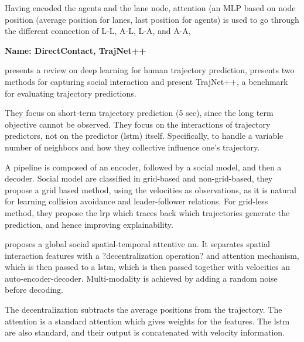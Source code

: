 Having encoded the agents and the lane node, attention (an MLP based on node position (average position for lanes, last position for agents) is used to go through the different connection of L-L, A-L, L-A, and A-A, 


\textbf{Name: DirectContact, TrajNet++}

\cite{kothari2021human} presents a review on deep learning for human trajectory prediction, presents two methods for capturing social interaction and present TrajNet++, a benchmark for evaluating trajectory predictions. 

They focus on short-term trajectory prediction (5 sec), since the long term objective cannot be observed.
%
They focus on the interactions of trajectory predictors, not on the predictor (\gls{lstm}) itself.
%
Specifically, to handle a variable number of neighbors and how they collective influence one's trajectory.

A pipeline is composed of an encoder, followed by a social model, and then a decoder.
%
Social model are classified in grid-based and non-grid-based, they propose a grid based method, using the velocities as observations, as it is natural for learning collision avoidance and leader-follower relations.
%
For grid-less method, they propose the \gls{lrp} which traces back which trajectories generate the prediction, and hence improving explainability.





\cite{xu2021tra2tra} proposes a global social spatial-temporal attentive \gls{nn}. 
%
It separates spatial interaction features with a ?decentralization operation? and attention mechanism, which is then passed to a \gls{lstm}, which is then passed together with velocities an auto-encoder-decoder.
%
Multi-modality is achieved by adding a random noise before decoding.

The decentralization subtracts the average positions from the trajectory.
%
The attention is a standard attention which gives weights for the features.
%
The \gls{lstm} are also standard, and their output is concatenated with velocity information.

